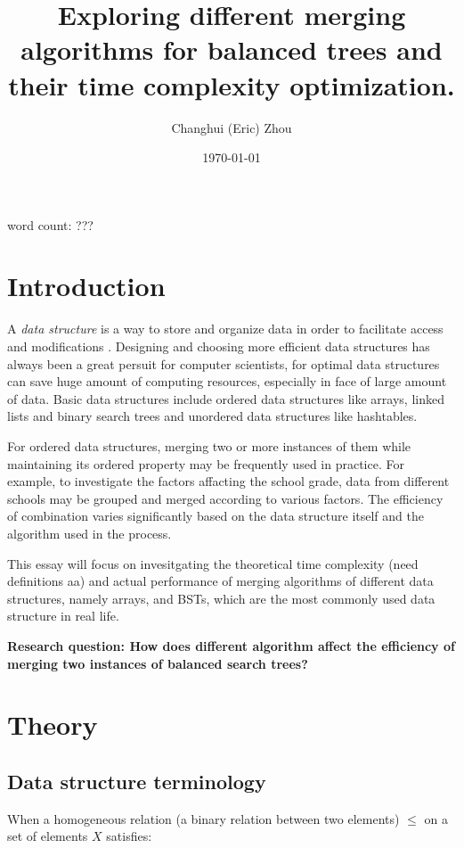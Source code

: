 \documentclass[12pt]{article}
\title{\textbf{Exploring different merging algorithms for balanced trees and their time complexity optimization.}}
\author{Changhui (Eric) Zhou}
\date{\today}
\begin{document}
\begin{titlepage}
    \maketitle
    \centering word count: ???
\end{titlepage}

\tableofcontents
\clearpage

\section{Introduction}

A \textit{data structure} is a way to store and organize data in order to facilitate access and modifications \cite{CLRS}. Designing and choosing more efficient data structures has always been a great persuit for computer scientists, for optimal data structures can save huge amount of computing resources, especially in face of large amount of data. Basic data structures include ordered data structures like arrays, linked lists and binary search trees and unordered data structures like hashtables. 

For ordered data structures, merging two or more instances of them while maintaining its ordered property may be frequently used in practice. For example, to investigate the factors affacting the school grade, data from different schools may be grouped and merged according to various factors. The efficiency of combination varies significantly based on the data structure itself and the algorithm used in the process. 

This essay will focus on invesitgating the theoretical time complexity (need definitions aa) and actual performance of merging algorithms of different data structures, namely arrays, and BSTs, which are the most commonly used data structure in real life. 

\textbf{Research question: How does different algorithm affect the efficiency of merging two instances of balanced search trees?}

\section{Theory}

\subsection{Data structure terminology}

When a homogeneous relation (a binary relation between two elements) $\le$ on a set of elements $X$ satisfies:
\end{document}
